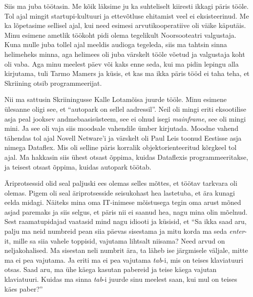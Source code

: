 
Siis ma juba töötasin. Me kõik läksime ju ka suhteliselt kiiresti ikkagi päris 
tööle. Tol ajal mingit startupi-kultuuri ja ettevõtluse ehitamist veel ei 
eksisteerinud. Me ka lõpetasime sellisel ajal, kui need esimesi 
arvutikooperatiive oli väike käputäis. Minu esimene ametlik töökoht pidi 
olema tegelikult Noorsooteatri valgustaja. Kuna mulle juba 
tollel ajal meeldis audioga tegeleda, siis ma tahtsin sinna helimeheks minna, 
aga helimees oli juba värskelt tööle võetud ja valgustaja koht oli vaba. Aga 
 minu meelest päev või kaks enne seda, kui ma pidin lepingu alla kirjutama, 
tuli Tarmo Mamers ja küsis, et kas ma ikka päris tööd ei 
taha teha, et Skriining otsib programmeerijat. 

Nii ma sattusin Skriiningusse Kalle Lotamõisa juurde 
tööle. Minu esimene ülesanne oligi see, et \enquote{autopark on sellel aadressil}. 
Neil oli mingi eriti eksootilise asja peal jooksev andmebaasisüsteem, see ei 
olnud isegi \emph{mainframe}, see oli mingi mini. Ja see oli vaja siis 
moodsale vahendile ümber kirjutada. Moodne vahend tähendas tol ajal Novell 
Netware'i ja värskelt oli Paul Leis toonud 
Eestisse asja nimega Dataflex. Mis oli selline päris 
 korralik objektorienteeritud kõrgkeel tol ajal. Ma hakkasin siis ühest otsast õppima, kuidas Dataflexis programmeeritakse, ja 
teisest otsast õppima, kuidas autopark töötab. 


Äriprotsessid olid seal paljuski ees olemas selles mõttes, et töötav tarkvara 
oli olemas. Pigem oli seal äriprotsesside seisukohast hea lastetuba, et ära 
kunagi eelda midagi. Näiteks mina oma IT-inimese mõistusega tegin  oma 
arust mõned asjad paremaks ja siis selgus, et päris nii ei saanud hea, nagu 
mina olin mõelnud. Sest raamatupidajad vaatasid mind nagu idiooti ja küsisid, et 
\enquote{Sa ikka saad aru, palju ma neid numbreid pean siia päevas sisestama 
ja mitu korda ma seda \emph{enter}-it, mille sa siia vahele toppisid,  vajutama 
lihtsalt niisama? Need arvud on neljakohalised. Ma sisestan neli numbrit ära, 
ta läheb ise järgmisele väljale, mitte ma ei pea vajutama. Ja eriti ma ei pea 
vajutama \emph{tab}-i, mis on teises klaviatuuri otsas. Saad aru, ma ühe käega kasutan 
pabereid ja teise käega vajutan klaviatuuri. Kuidas ma sinna \emph{tab}-i juurde sinu 
meelest saan, kui mul on teises käes paber?} 

